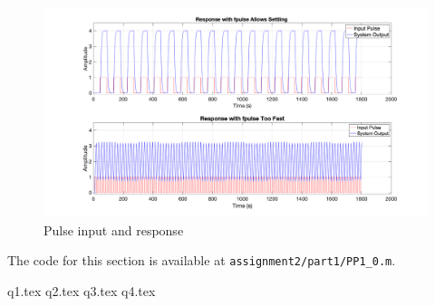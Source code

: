 \begin{figure}
	\centering
	\includegraphics[width=\textwidth]{images/pp03.png}
	\caption{Pulse input and response}
	\label{fig:pp03}
\end{figure}

\noindent The code for this section is available at \lstinline|assignment2/part1/PP1_0.m|. 


{q1.tex}
{q2.tex}
{q3.tex}
{q4.tex}